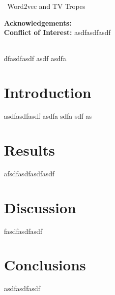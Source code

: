 \documentclass[]{article}
\date{}
\makeatletter
\def\wileyIndent{1pt}
\renewenvironment{abstract}
{\vspace*{-1pc}\trivlist\item[]\leftskip\wileyIndent\hrulefill\par\vskip4pt\noindent\textbf{\abstractname}\mbox{\null}\\}{\par\noindent\hrulefill\endtrivlist}
\def\author#1{\gdef\@author{\hskip-\dimexpr(\tabcolsep)\hskip\wileyIndent\parbox{\dimexpr\textwidth-\wileyIndent}{\centering\bfseries#1}}}
\def\title#1{\gdef\@title{\centering\bfseries\ifx\@articleType\@empty\else\@articleType\\\fi#1}}
\let\@articleType\@empty \def\articletype#1{\gdef\@articleType{{\normalfont\itshape#1}}}
\def\thanksspace{{\phantom{\textsuperscript{\thefootnote}}}}
\makeatother
\begin{document}
\title{Word2vec and TV Tropes}
\author{JJ Merelo\thanks{E-mail:                     
                    jmerelo@ugr.es}{\thanksspace}}

\def\RunningHead{}\def\RunningAuthor{JJ Merelo}

\maketitle 


\def\RunningHead{{Word2vec and TV Tropes}}
\begin{center}
\par\vskip1pc~\RunningHead ~\\
\end{center}
\noindent\textbf{Acknowledgements: }~\\\noindent\textbf{Conflict of Interest: } asdfasdfasdf


\begin{abstract}
 dfasdfasdf asdf asdfa\def\keywordstitle{Keywords}
\end{abstract}
    
\section{Introduction}
 asdfasdfasdf asdfa sdfa sdf as
    
\section{Results}
 afsdfasdfasdfasdf
    
\section{Discussion}
 fasdfasdfasdf
    
\section{Conclusions}
asdfasdfasdf
    





\end{document}
